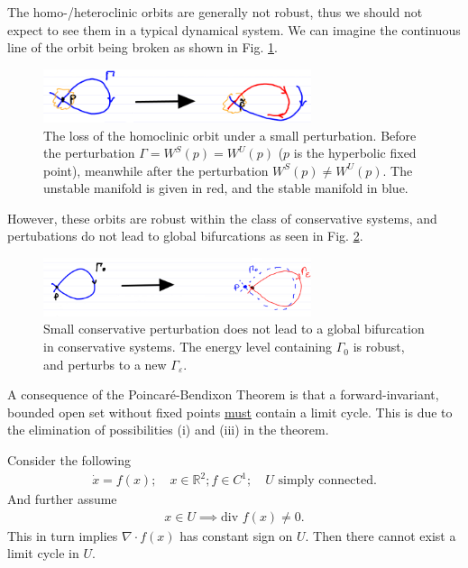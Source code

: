 \begin{remark}[]
	The homo-/heteroclinic orbits are generally not robust, thus we should not expect to see them in a typical dynamical system. We can imagine the continuous line of the orbit being broken as shown in Fig. \ref{fig:pd_robust}.
	\begin{figure}[h!]
		\centering
		\includegraphics[width=0.7\textwidth]{figures/ch4/9pd_robust.png}
		\caption{The loss of the homoclinic orbit under a small perturbation. Before the perturbation $\Gamma=W^{S}(p)=W^{U}(p)$ ($p$ is the hyperbolic fixed point), meanwhile after the perturbation $W ^{S}(p) \neq W^{U} (p)$. The unstable manifold is given in red, and the stable manifold in blue.}
		\label{fig:pd_robust}
	\end{figure}
	However, these orbits are robust within the class of conservative systems, and pertubations do not lead to global bifurcations as seen in Fig. \ref{fig:pd_conservative}.
	\begin{figure}[h!]
		\centering
		\includegraphics[width=0.7\textwidth]{figures/ch4/10pd_conservative.png}
		\caption{Small conservative perturbation does not lead to a global bifurcation in conservative systems. The energy level containing $\Gamma_0$ is robust, and perturbs to a new $\Gamma_\varepsilon$.}
		\label{fig:pd_conservative}
	\end{figure}
	
\end{remark}
\begin{remark}[]
	A consequence of the Poincaré-Bendixon Theorem is that a forward-invariant, bounded open set without fixed points \underline{must} contain a limit cycle. This is due to the elimination of possibilities (i) and (iii) in the theorem. 
\end{remark}
\begin{proposition}
	Consider the following
	\begin{align}
		\dot{x}	= f(x);\quad x\in \mathbb{R}^{2}; f\in C^{1};\quad U  \textrm{ simply connected} .
	\end{align}
And further assume 
 \begin{align}
	  x\in U \implies \textrm{div }  f(x) \neq 0.
\end{align}
This in turn implies $\nabla \cdot f(x)$ has constant sign on $U$. Then there cannot exist a limit cycle in $U$.
\end{proposition}
